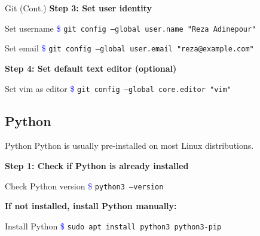 \documentclass{beamer}
\begin{document}
	
	
	\begin{frame}{Git (Cont.)}
		\textbf{Step 3: Set user identity}

		\begin{exampleblock}{Set username}
			\textcolor{blue}{\$} \texttt{git config --global user.name "Reza Adinepour"}
		\end{exampleblock}
		
		\begin{exampleblock}{Set email}
			\textcolor{blue}{\$} \texttt{git config --global user.email "reza@example.com"}
		\end{exampleblock}
		
		\textbf{Step 4: Set default text editor (optional)}
		
		\begin{exampleblock}{Set vim as editor}
			\textcolor{blue}{\$} \texttt{git config --global core.editor "vim"}
		\end{exampleblock}
	\end{frame}
	
	
	
	
	
	
	
	\subsection{Python}
	\begin{frame}{Python}
		Python is usually pre-installed on most Linux distributions.
		
		\vspace{0.3cm}
		\textbf{Step 1: Check if Python is already installed}
		
		\begin{exampleblock}{Check Python version}
			\textcolor{blue}{\$} \texttt{python3 --version}
		\end{exampleblock}
		
		\textbf{If not installed, install Python manually:}
		
		\begin{exampleblock}{Install Python}
			\textcolor{blue}{\$} \texttt{sudo apt install python3 python3-pip}
		\end{exampleblock}
	\end{frame}
	
	
	
	
	
\end{document}
